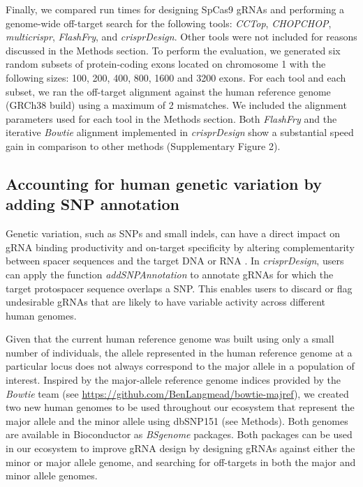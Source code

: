 \documentclass[pdftex,english,10pt]{article}
\begin{document}
Finally, we compared run times for designing SpCas9 gRNAs and performing a genome-wide off-target search for the following tools: \textit{CCTop}, \textit{CHOPCHOP}, \textit{multicrispr}, \textit{FlashFry}, and \textit{crisprDesign}. Other tools were not included for reasons discussed in the Methods section. To perform the evaluation, we generated six random subsets of protein-coding exons located on chromosome 1 with the following sizes: 100, 200, 400, 800, 1600 and 3200 exons. For each tool and each subset, we ran the off-target alignment against the human reference genome (GRCh38 build) using a maximum of 2 mismatches. We included the alignment parameters used for each tool in the Methods section. Both \textit{FlashFry} and the iterative \textit{Bowtie} alignment implemented in \textit{crisprDesign} show a substantial speed gain in comparison to other methods (Supplementary Figure 2).



 
\subsection*{Accounting for human genetic variation by adding SNP annotation}

Genetic variation, such as SNPs and small indels, can have a direct impact on gRNA binding productivity and on-target specificity by altering complementarity between spacer sequences and the target DNA or RNA \citep{scott2017implications, lessard2017human, canver2017variant, wang2018genetic}. 
In \textit{crisprDesign}, users can apply the function \textit{addSNPAnnotation} to annotate gRNAs for which the target protospacer sequence overlaps a SNP.
This enables users to discard or flag undesirable gRNAs that are likely to have variable activity across different human genomes.

Given that the current human reference genome was built using only a small number of individuals, the allele represented in the human reference genome at a particular locus does not always correspond to the major allele in a population of interest. Inspired by the major-allele reference genome indices provided by the \textit{Bowtie} team (see \url{https://github.com/BenLangmead/bowtie-majref}), we created two new human genomes to be used throughout our ecosystem that represent the major allele and the minor allele using dbSNP151 (see Methods). Both genomes are available in Bioconductor as \textit{BSgenome} packages. Both packages can be used in our ecosystem to improve gRNA design by designing gRNAs against either the minor or major allele genome, and searching for off-targets in both the major and minor allele genomes. 
\end{document}
